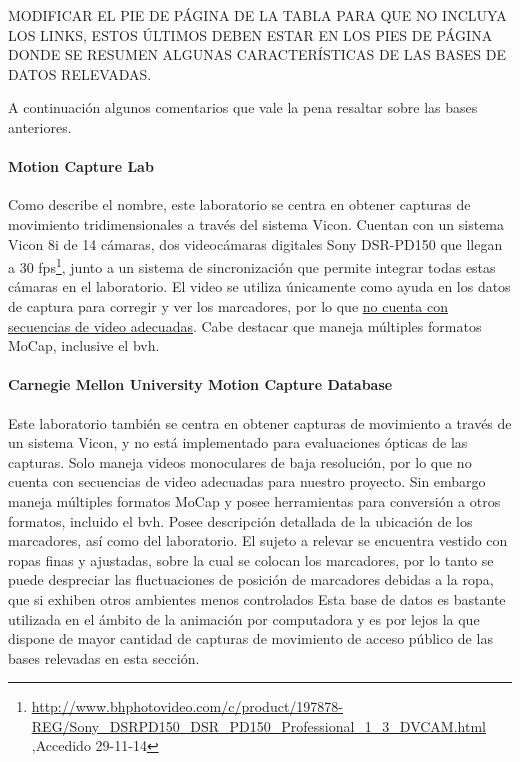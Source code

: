\begin{table}[h!]
\begin{minipage}{\textwidth}
\begin{tabular}{||l|ccccc||}
	\end{tabular}
	\end{minipage}
	
\end{table}
 
MODIFICAR EL PIE DE PÁGINA DE LA TABLA PARA QUE NO INCLUYA LOS LINKS, ESTOS ÚLTIMOS DEBEN ESTAR EN LOS PIES DE PÁGINA DONDE SE RESUMEN ALGUNAS CARACTERÍSTICAS DE LAS BASES DE DATOS RELEVADAS.

A continuación algunos comentarios que vale la pena resaltar sobre  las bases anteriores.


\paragraph{Motion Capture Lab}
	Como describe el nombre, este laboratorio se centra en obtener capturas de movimiento tridimensionales a través del sistema Vicon. Cuentan con un sistema Vicon 8i de 14 cámaras, dos videocámaras digitales Sony DSR-PD150 que llegan a 30 fps\footnote{\textcolor{blue}{\underline{\url{http://www.bhphotovideo.com/c/product/197878-REG/Sony_DSRPD150_DSR_PD150_Professional_1_3_DVCAM.html}}} ,Accedido 29-11-14 }, junto a un sistema de sincronización que permite integrar todas estas cámaras en el laboratorio. El video se utiliza únicamente como ayuda en los datos de captura para corregir y ver los marcadores,  por lo que \underline{no cuenta con secuencias de video adecuadas}. Cabe destacar que maneja múltiples formatos MoCap, inclusive el bvh. 



\paragraph{Carnegie Mellon University Motion Capture Database}
 Este laboratorio también se centra en obtener capturas de movimiento a través de un sistema Vicon, y no está implementado para evaluaciones ópticas de las capturas. Solo maneja videos monoculares de baja resolución, por lo que no cuenta con secuencias de video adecuadas para nuestro proyecto. Sin embargo maneja múltiples formatos MoCap y  posee herramientas para conversión a otros formatos, incluido el bvh. Posee descripción detallada de la ubicación de los marcadores, así como del laboratorio. El sujeto a relevar se encuentra vestido con ropas finas y ajustadas, sobre la cual se colocan los marcadores, por lo tanto se puede despreciar las fluctuaciones de posición de marcadores debidas a la ropa, que si exhiben otros ambientes menos controlados  Esta base de datos es bastante utilizada en el ámbito de la  animación por computadora y es por lejos la que dispone de mayor cantidad de capturas de movimiento de acceso público de las bases relevadas en esta sección.

